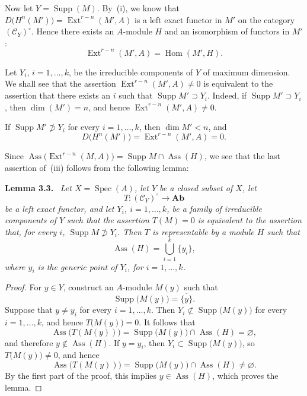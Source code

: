 \documentclass[11pt,a4paper]{article}
\newcommand{\Homop}{\operatorname{Hom}}
\newcommand{\Extop}{\operatorname{Ext}}
\newcommand{\Assop}{\operatorname{Ass}}
\newcommand{\Specop}{\operatorname{Spec}}
\newcommand{\Suppop}{\operatorname{Supp}}
\newcommand{\Ab}{\mathbf{Ab}}
\newcommand{\srcpage}[1]{\marginpar{\raggedright\scriptsize\color{rulegray}French printed p.~#1}}
\newenvironment{sgalemma}[1]{\par\addvspace{0.8\baselineskip}\noindent\textbf{#1.}\ \itshape}{\par}
\theoremstyle{sgaprop}
\theoremstyle{sgacor}
\begin{document}
\medskip
Now let $Y=\Suppop(M)$. By~\textup{(i)}, we know that
$D\bigl(H^n(M')\bigr)=\Extop^{r-n}(M',A)$ is a left exact functor in $M'$ on
the category $(\mathcal C_Y)^\circ$. Hence there exists an $A$-module $H$ and
an isomorphism of functors in $M'$:
\[
  \Extop^{r-n}(M',A)=\Homop(M',H).
\]

Let $Y_i$, $i=1,\ldots,k$, be the irreducible components of $Y$ of maximum
dimension. We shall see that the assertion
$\Extop^{r-n}(M',A)\neq 0$ is equivalent to the assertion that there exists an
$i$ such that $\Suppop M'\supset Y_i$. Indeed, if
$\Suppop M'\supset Y_i$, then $\dim(M')=n$, and hence
$\Extop^{r-n}(M',A)\neq 0$.

If $\Suppop M'\not\supset Y_i$ for every $i=1,\ldots,k$, then
$\dim M'<n$, and
\[
  D\bigl(H^n(M')\bigr)=\Extop^{r-n}(M',A)=0.
\]

Since
$\Assop\bigl(\Extop^{r-n}(M,A)\bigr)=\Suppop M\cap\Assop(H)$, we see that
the last assertion of~\textup{(iii)} follows from the following lemma:

\begin{sgalemma}{Lemma 3.3}
Let $X=\Specop(A)$, let $Y$ be a closed subset of $X$, let
\[
  T\colon(\mathcal C_Y)^\circ\longrightarrow\Ab
\]
be a left exact functor, and let $Y_i$, $i=1,\ldots,k$, be a family of
irreducible components of $Y$ such that the assertion $T(M)=0$ is equivalent
to the assertion that, for every $i$, $\Suppop M\not\supset Y_i$. Then $T$ is
representable by a module $H$ such that
\[
  \Assop(H)=\bigcup_{i=1}^k\{y_i\},
\]
where $y_i$ is the generic point of $Y_i$, for $i=1,\ldots,k$.
\end{sgalemma}

\begin{proof}
For $y\in Y$, construct\srcpage{70} an $A$-module $M(y)$ such that
\[
  \Suppop\bigl(M(y)\bigr)=\overline{\{y\}}.
\]
Suppose that $y\neq y_i$ for every $i=1,\ldots,k$. Then
$Y_i\not\subset\Suppop\bigl(M(y)\bigr)$ for every $i=1,\ldots,k$, and hence
$T\bigl(M(y)\bigr)=0$. It follows that
\[
  \Assop\bigl(T(M(y))\bigr)
  =\Suppop\bigl(M(y)\bigr)\cap\Assop(H)=\varnothing,
\]
and therefore $y\notin\Assop(H)$. If $y=y_i$, then
$Y_i\subset\Suppop\bigl(M(y)\bigr)$, so $T\bigl(M(y)\bigr)\neq0$, and hence
\[
  \Assop\bigl(T(M(y))\bigr)
  =\Suppop\bigl(M(y)\bigr)\cap\Assop(H)\neq\varnothing.
\]
By the first part of the proof, this implies $y\in\Assop(H)$, which proves
the lemma.\qedhere
\end{proof}
\end{document}

